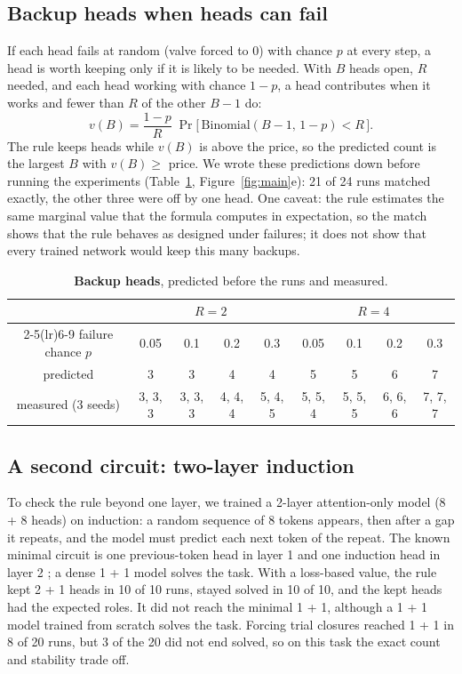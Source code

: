 \documentclass[11pt]{article}
\begin{document}
\subsection{Backup heads when heads can fail}
\label{sec:backup}

If each head fails at random (valve forced to 0) with chance $p$ at every step, a head is worth
keeping only if it is likely to be needed. With $B$ heads open, $R$ needed, and each head working
with chance $1 - p$, a head contributes when it works and fewer than $R$ of the other $B - 1$ do:
\begin{equation}
v(B) = \frac{1 - p}{R}\; \Pr\big[\,\text{Binomial}(B - 1,\, 1 - p) < R\,\big].
\end{equation}
The rule keeps heads while $v(B)$ is above the price, so the predicted count is the largest $B$
with $v(B) \ge$ price. We wrote these predictions down before running the experiments
(Table~\ref{tab:backup}, Figure~\ref{fig:main}e): 21 of 24 runs matched exactly, the other three
were off by one head. One caveat: the rule estimates the same marginal value that the formula
computes in expectation, so the match shows that the rule behaves as designed under failures; it
does not show that every trained network would keep this many backups.

\begin{table}[h]
\centering
\begin{tabular}{ccccccccc}
\toprule
& \multicolumn{4}{c}{$R = 2$} & \multicolumn{4}{c}{$R = 4$} \\
\cmidrule(lr){2-5}\cmidrule(lr){6-9}
failure chance $p$ & 0.05 & 0.1 & 0.2 & 0.3 & 0.05 & 0.1 & 0.2 & 0.3 \\
\midrule
predicted & 3 & 3 & 4 & 4 & 5 & 5 & 6 & 7 \\
measured (3 seeds) & 3, 3, 3 & 3, 3, 3 & 4, 4, 4 & 5, 4, 5 & 5, 5, 4 & 5, 5, 5 & 6, 6, 6 & 7, 7, 7 \\
\bottomrule
\end{tabular}
\caption{\textbf{Backup heads}, predicted before the runs and measured.}
\label{tab:backup}
\end{table}

\subsection{A second circuit: two-layer induction}

To check the rule beyond one layer, we trained a 2-layer attention-only model (8 + 8 heads) on
induction: a random sequence of 8 tokens appears, then after a gap it repeats, and the model must
predict each next token of the repeat. The known minimal circuit is one previous-token head in
layer 1 and one induction head in layer 2 \citep{olsson}; a dense 1 + 1 model solves the task. With
a loss-based value, the rule kept 2 + 1 heads in 10 of 10 runs, stayed solved in 10 of 10, and the
kept heads had the expected roles. It did not reach the minimal 1 + 1, although a 1 + 1 model trained from scratch solves the task. Forcing trial closures reached 1 + 1 in 8 of 20 runs, but 3 of the 20 did not end solved,
so on this task the exact count and stability trade off.
\end{document}
